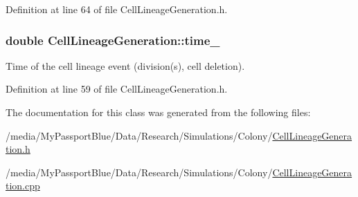 \-Definition at line 64 of file \-Cell\-Lineage\-Generation.\-h.

\hypertarget{class_cell_lineage_generation_a49b7013584bc82fd66cc1e3f9e768c71}{
\subsubsection[{time\-\_\-}]{\setlength{\rightskip}{0pt plus 5cm}double {\bf \-Cell\-Lineage\-Generation\-::time\-\_\-}}}\label{class_cell_lineage_generation_a49b7013584bc82fd66cc1e3f9e768c71}
\-Time of the cell lineage event (division(s), cell deletion). 

\-Definition at line 59 of file \-Cell\-Lineage\-Generation.\-h.



\-The documentation for this class was generated from the following files\-:\begin{DoxyCompactItemize}
\item 
/media/\-My\-Passport\-Blue/\-Data/\-Research/\-Simulations/\-Colony/\hyperlink{_cell_lineage_generation_8h}{\-Cell\-Lineage\-Generation.\-h}\item 
/media/\-My\-Passport\-Blue/\-Data/\-Research/\-Simulations/\-Colony/\hyperlink{_cell_lineage_generation_8cpp}{\-Cell\-Lineage\-Generation.\-cpp}\end{DoxyCompactItemize}

